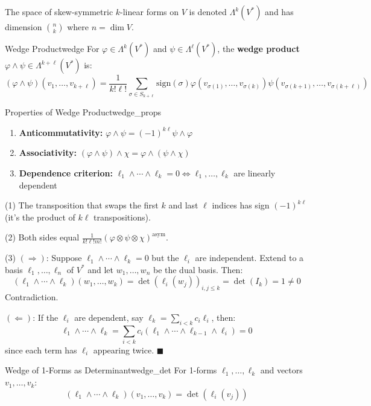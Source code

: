 \documentclass[11pt, letterpaper, openany]{book}
\renewenvironment{proof}[1][\proofname]{%
  \tcolorbox[blanker, breakable, left=1em,
    before skip=1em, after skip=1em,
    borderline west={2pt}{0pt}{MagicTeal!50},
    colback=MagicCream,
    before upper={\textcolor{MagicTeal}{\sffamily\bfseries #1.}\space}
  ]%
}{%
  \hfill\textcolor{MagicTeal}{\ensuremath{\blacksquare}}\endtcolorbox%
}
\begin{document}
The space of skew-symmetric $k$-linear forms on $V$ is denoted $\Lambda^k(V^*)$ and has dimension $\binom{n}{k}$ where $n = \dim V$.

\begin{defn}{Wedge Product}{wedge}
For $\varphi \in \Lambda^k(V^*)$ and $\psi \in \Lambda^\ell(V^*)$, the \textbf{wedge product} $\varphi \wedge \psi \in \Lambda^{k+\ell}(V^*)$ is:
\[
(\varphi \wedge \psi)(v_1, \ldots, v_{k+\ell}) = \frac{1}{k!\ell!} \sum_{\sigma \in S_{k+\ell}} \text{sign}(\sigma) \varphi(v_{\sigma(1)}, \ldots, v_{\sigma(k)}) \psi(v_{\sigma(k+1)}, \ldots, v_{\sigma(k+\ell)})
\]
\end{defn}

\begin{thm}{Properties of Wedge Product}{wedge_props}
\begin{enumerate}
    \item \textbf{Anticommutativity:} $\varphi \wedge \psi = (-1)^{k\ell} \psi \wedge \varphi$
    \item \textbf{Associativity:} $(\varphi \wedge \psi) \wedge \chi = \varphi \wedge (\psi \wedge \chi)$
    \item \textbf{Dependence criterion:} $\ell_1 \wedge \cdots \wedge \ell_k = 0 \iff \ell_1, \ldots, \ell_k$ are linearly dependent
\end{enumerate}
\end{thm}

\begin{proof}
(1) The transposition that swaps the first $k$ and last $\ell$ indices has sign $(-1)^{k\ell}$ (it's the product of $k\ell$ transpositions).

(2) Both sides equal $\frac{1}{k!\ell!m!}(\varphi \otimes \psi \otimes \chi)^{\text{asym}}$.

(3) $(\Rightarrow)$: Suppose $\ell_1 \wedge \cdots \wedge \ell_k = 0$ but the $\ell_i$ are independent. Extend to a basis $\ell_1, \ldots, \ell_n$ of $V^*$ and let $w_1, \ldots, w_n$ be the dual basis. Then:
\[(\ell_1 \wedge \cdots \wedge \ell_k)(w_1, \ldots, w_k) = \det(\ell_i(w_j))_{i,j \leq k} = \det(I_k) = 1 \neq 0\]
Contradiction.

$(\Leftarrow)$: If the $\ell_i$ are dependent, say $\ell_k = \sum_{i<k} c_i \ell_i$, then:
\[\ell_1 \wedge \cdots \wedge \ell_k = \sum_{i<k} c_i (\ell_1 \wedge \cdots \wedge \ell_{k-1} \wedge \ell_i) = 0\]
since each term has $\ell_i$ appearing twice.
\end{proof}

\begin{thm}{Wedge of 1-Forms as Determinant}{wedge_det}
For 1-forms $\ell_1, \ldots, \ell_k$ and vectors $v_1, \ldots, v_k$:
\[(\ell_1 \wedge \cdots \wedge \ell_k)(v_1, \ldots, v_k) = \det(\ell_i(v_j))\]
\end{thm}
\end{document}
